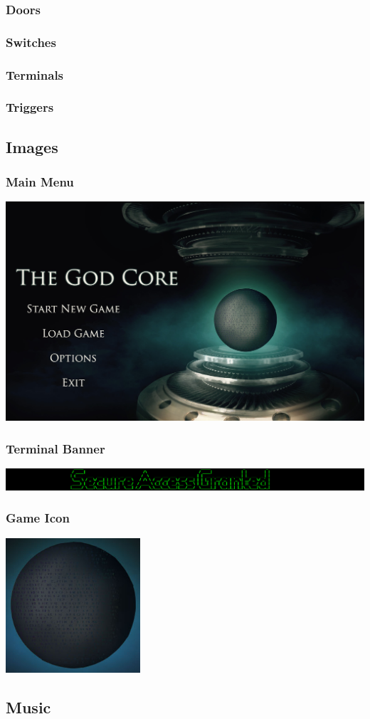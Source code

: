 \documentclass{article}
\begin{document}
\subsubsection{Doors}

\subsubsection{Switches}

\subsubsection{Terminals}

\subsubsection{Triggers}

\subsection{Images}

\subsubsection{Main Menu}
	\includegraphics[width=18cm]{../Resources/Images/Main}
\subsubsection{Terminal Banner}
	\includegraphics[width=18cm]{../Resources/Images/banner}
\subsubsection{Game Icon}
	\includegraphics[width=5cm]{../Resources/Images/Core}
\subsection{Music}
\end{document}
